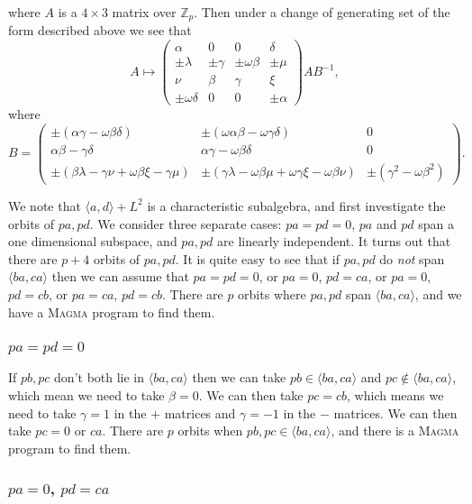 \documentclass[10pt]{article}
\begin{document}
where $A$ is a $4\times 3$ matrix over $\mathbb{Z}_{p}$. Then under a change
of generating set of the form described above we see that 
\[
A\mapsto \left( 
\begin{array}{cccc}
\alpha & 0 & 0 & \delta \\ 
\pm \lambda & \pm \gamma & \pm \omega \beta & \pm \mu \\ 
\nu & \beta & \gamma & \xi \\ 
\pm \omega \delta & 0 & 0 & \pm \alpha%
\end{array}%
\right) AB^{-1}, 
\]%
where%
\[
B=\left( 
\begin{array}{ccc}
\pm (\alpha \gamma -\omega \beta \delta ) & \pm (\omega \alpha \beta -\omega
\gamma \delta ) & 0 \\ 
\alpha \beta -\gamma \delta & \alpha \gamma -\omega \beta \delta & 0 \\ 
\pm (\beta \lambda -\gamma \nu +\omega \beta \xi -\gamma \mu ) & \pm (\gamma
\lambda -\omega \beta \mu +\omega \gamma \xi -\omega \beta \nu ) & \pm
(\gamma ^{2}-\omega \beta ^{2})%
\end{array}%
\right) . 
\]

We note that $\langle a,d\rangle +L^{2}$ is a characteristic subalgebra, and
first investigate the orbits of $pa,pd$. We consider three separate cases: $%
pa=pd=0$, $pa$ and $pd$ span a one dimensional subspace, and $pa,pd$ are
linearly independent. It turns out that there are $p+4$ orbits of $pa,pd$.
It is quite easy to see that if $pa,pd$ do \emph{not} span $\langle
ba,ca\rangle $ then we can assume that $pa=pd=0$, or $pa=0$, $pd=ca$, or $%
pa=0$, $pd=cb$, or $pa=ca$, $pd=cb$. There are $p$ orbits where $pa,pd$ span 
$\langle ba,ca\rangle $, and we have a \textsc{Magma} program to find them.

\subsubsection{$pa=pd=0$}

If $pb,pc$ don't both lie in $\langle ba,ca\rangle $ then we can take $pb\in
\langle ba,ca\rangle $ and $pc\notin \langle ba,ca\rangle $, which mean we
need to take $\beta =0$. We can then take $pc=cb$, which means we need to
take $\gamma =1$ in the $+$ matrices and $\gamma =-1$ in the $-$ matrices.
We can then take $pc=0$ or $ca$. There are $p$ orbits when $pb,pc\in \langle
ba,ca\rangle $, and there is a \textsc{Magma} program to find them.

\subsubsection{$pa=0$, $pd=ca$}
\end{document}
